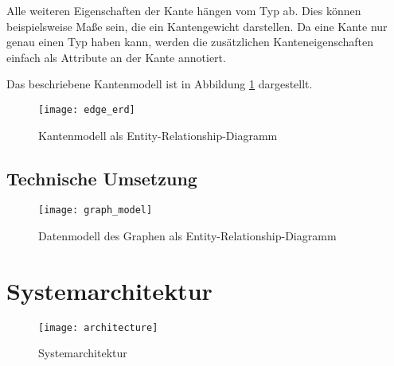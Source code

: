 Alle weiteren Eigenschaften der Kante hängen vom Typ ab. Dies können beispielsweise Maße sein, die ein Kantengewicht darstellen. Da eine Kante nur genau einen Typ haben kann, werden die zusätzlichen Kanteneigenschaften einfach als Attribute an der Kante annotiert.

Das beschriebene Kantenmodell ist in Abbildung \ref{fig:edge_erd} dargestellt.

\begin{figure}
\label{fig:edge_erd}
\begin{center}
    \texttt{[image: edge\_erd]}
\end{center}
\caption{Kantenmodell als Entity-Relationship-Diagramm}
\end{figure}

\subsection{Technische Umsetzung}

\begin{figure}
\label{fig:graph_model}
\begin{center}
    \texttt{[image: graph\_model]}
\end{center}
\caption{Datenmodell des Graphen als Entity-Relationship-Diagramm}
\end{figure}

\section{Systemarchitektur}

\begin{figure}
\label{fig:architecture}
\begin{center}
    \texttt{[image: architecture]}
\end{center}
\caption{Systemarchitektur}
\end{figure}

